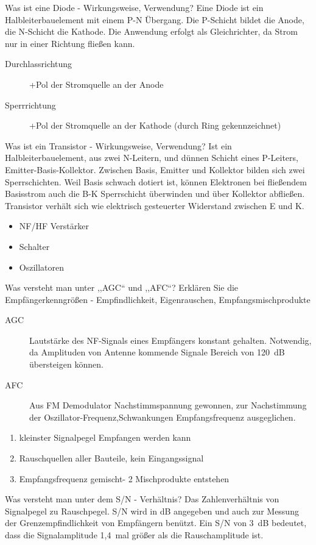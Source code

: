 \documentclass[avery5371,grid,frame,a4paper]{flashcards}
\newcommand{\card}[3]{
  \begin{flashcard}[{\chap} -- #1]{#2}#3\end{flashcard}
}
\begin{document}
\card{22}{Was ist eine Diode - Wirkungsweise, Verwendung?}{
  Eine Diode ist ein Halbleiterbauelement mit einem P-N Übergang. Die P-Schicht bildet die Anode, die N-Schicht die Kathode. Die Anwendung erfolgt als Gleichrichter, da Strom nur in einer Richtung fließen kann.
  \begin{description}
    \item[Durchlassrichtung] +Pol der Stromquelle an der Anode
    \item[Sperrrichtung] +Pol der Stromquelle an der Kathode (durch Ring gekennzeichnet)
  \end{description}
}
\card{23}{Was ist ein Transistor - Wirkungsweise, Verwendung?}{
  \small
  Ist ein Halbleiterbauelement, aus zwei N-Leitern, und dünnen Schicht eines P-Leiters, Emitter-Basis-Kollektor. Zwischen Basis, Emitter und Kollektor bilden sich zwei Sperrschichten. Weil Basis schwach dotiert ist, können Elektronen bei fließendem Basisstrom auch die B-K Sperrschicht überwinden und über Kollektor abfließen. Transistor verhält sich wie elektrisch gesteuerter Widerstand zwischen E und K.

  \begin{itemize}\itemsep-1pt
    \item NF/HF Verstärker
    \item Schalter
    \item Oszillatoren
  \end{itemize}
}
\card{24}{Was versteht man unter ,,AGC`` und ,,AFC``? Erklären Sie die Empfängerkenngrößen - Empfindlichkeit, Eigenrauschen, Empfangsmischprodukte}{
  \footnotesize
  \begin{description}
    \item[AGC] Lautstärke des NF-Signals eines Empfängers konstant gehalten. Notwendig, da Amplituden von Antenne kommende Signale Bereich von 120~dB übersteigen können.
    \item[AFC] Aus FM Demodulator Nachstimmspannung gewonnen, zur Nachstimmung der Oszillator-Frequenz,Schwankungen Empfangsfrequenz ausgeglichen.
  \end{description}
  \begin{enumerate}
    \item kleinster Signalpegel Empfangen werden kann
    \item Rauschquellen aller Bauteile, kein Eingangssignal
    \item Empfangsfrequenz gemischt- 2 Mischprodukte entstehen
  \end{enumerate}
}
\card{26}{Was versteht man unter dem S/N - Verhältnis?}{
  Das Zahlenverhältnis von Signalpegel zu Rauschpegel. S/N wird in dB angegeben und auch zur Messung der Grenzempfindlichkeit von Empfängern benützt.
  Ein S/N von 3~dB bedeutet, dass die Signalamplitude 1,4~mal größer als die Rauschamplitude ist.
}
\end{document}
